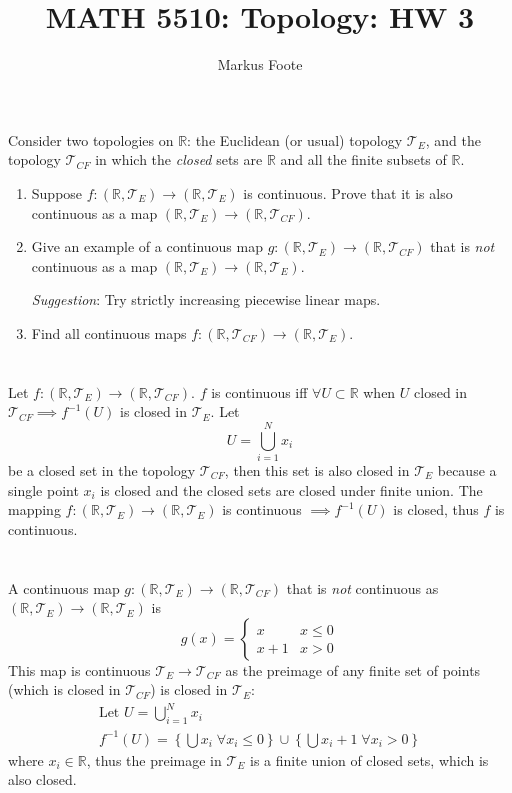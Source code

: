 \documentclass{jhwhw}
\title{MATH 5510: Topology: HW 3}
\author{Markus Foote}
\newcommand{\R}{{\mathbb R}}
\newcommand{\T}{{\mathcal T}}
\begin{document}
\problem{}%
 Consider two topologies on $\R$:  the Euclidean (or usual) topology $\T_E$, and the topology $\T_{CF}$ in which the \emph{closed} sets are $\R$ and all the finite subsets of $\R$.
 
 \begin{enumerate}
 	
 	\item Suppose $f:(\R,\T_E)\to (\R,\T_E)$ is continuous.  Prove that it is also continuous as a map $(\R,\T_E) \to (\R,\T_{CF})$.
 	
 	\item Give an example of  a continuous map $g:(\R,\T_E)\to (\R,\T_{CF})$ that is \emph{not} continuous as a map $(\R,\T_E)\to (\R,\T_E)$.
 	
 	\emph{Suggestion}:  Try strictly increasing piecewise linear maps.
 	
 	\item Find all continuous maps $f:(\R,\T_{CF})\to (\R,\T_E)$.
 \end{enumerate}
\solution{}
\part{}
Let $f: (\R,\T_E)\to(\R,\T_{CF})$. $f$ is continuous iff $\forall U \subset \R$ when $U$ closed in $\T_{CF} \implies f^{-1}(U)$ is closed in $\T_E$.
Let \begin{equation}U = \bigcup\limits_{i=1}^{N} x_i \end{equation} be a closed set in the topology $\T_{CF}$, then this set is also closed in $\T_E$ because a single point $x_i$ is closed and the closed sets are closed under finite union. The mapping $f:(\R,\T_E)\to(\R,\T_E)$ is continuous $\implies f^{-1}(U)$ is closed, thus $f$ is continuous. 

\part{}
A continuous map $g:(\R,\T_E)\to (\R,\T_{CF})$ that is \emph{not} continuous as $(\R,\T_E)\to (\R,\T_E)$ is \begin{equation}g(x) = \begin{cases} x & x\le 0 \\ x+1 & x >0 \end{cases}\end{equation} 
This map is continuous $\T_E \to \T_{CF}$ as the preimage of any finite set of points (which is closed in $\T_{CF}$) is closed in $\T_E$:
\begin{gather}
\text{Let } U= \bigcup\limits_{i=1}^{N} x_i\\
f^{-1}(U) = \left\{ \bigcup x_i \;\forall x_i \le 0 \right\} \cup \left\{\bigcup x_i+1 \; \forall x_i > 0\right\}
\end{gather}
where $x_i\in\R$, thus the preimage in $\T_E$ is a finite union of closed sets, which is also closed.
\end{document}
